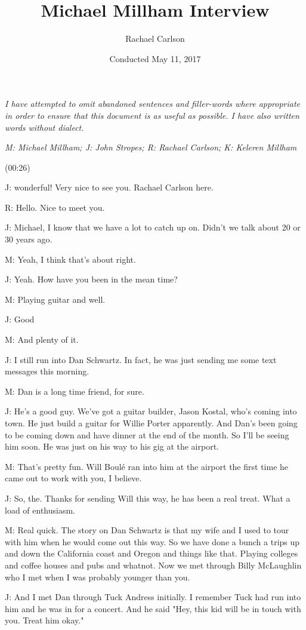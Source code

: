 \documentclass[11pt]{article}
\author{Rachael Carlson}
\date{Conducted May 11, 2017}
\title{Michael Millham Interview}
\begin{document}
\maketitle
\flushleft

\emph{I have attempted to omit abandoned sentences and filler-words where appropriate in order to ensure that this document is as useful as possible. I have also written words without dialect.}

\emph{M: Michael Millham; J: John Stropes; R: Rachael Carlson; K: Keleren Millham}

(00:26)

J: wonderful! Very nice to see you. Rachael Carlson here.

R: Hello. Nice to meet you.

J: Michael, I know that we have a lot to catch up on. Didn't we talk about 20 or 30 years ago. 

M: Yeah, I think that's about right.

J: Yeah. How have you been in the mean time?

M: Playing guitar and well.

J: Good

M: And plenty of it.

J: I still run into Dan Schwartz. In fact, he was just sending me some text messages this morning.

M: Dan is a long time friend, for sure.  

J: He's a good guy. We've got a guitar builder, Jason Kostal, who's coming into town. He just build a guitar for Willie Porter apparently. And Dan's been going to be coming down and have dinner at the end of the month. So I'll be seeing him soon. He was just on his way to his gig at the airport.

M: That's pretty fun. Will Boulé ran into him at the airport the first time he came out to work with you, I believe.

J: So, the. Thanks for sending Will this way, he has been a real treat. What a load of enthusiasm.

M: Real quick. The story on Dan Schwartz is that my wife and I used to tour with him when he would come out this way. So we have done a bunch a trips up and down the California coast and Oregon and things like that. Playing colleges and coffee houses and pubs and whatnot. Now we met through Billy McLaughlin who I met when I was probably younger than you. 

J: And I met Dan through Tuck Andress initially. I remember Tuck had run into him and he was in for a concert. And he said "Hey, this kid will be in touch with you. Treat him okay."
\end{document}
